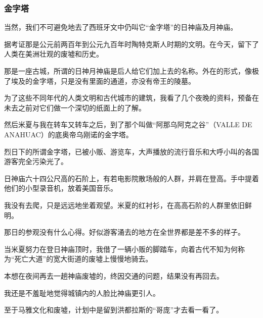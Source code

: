 \subsubsection*{金字塔}
\par 当然，我们不可避免地去了西班牙文中仍叫它“金字塔”的日神庙及月神庙。
\par 据考证那是公元前两百年到公元九百年时陶特克斯人时期的文明。在今天，留下了人类在美洲壮观的废墟和历史。
\par 那是一座古城，所谓的日神月神庙是后人给它们加上去的名称。外在的形式，像极了埃及的金字塔，只是没有里面的通道，亦没有帝王的陵墓。
\par 为了这些不同年代的人类文明和古代城市的建筑，我看了几个夜晚的资料，预备在未去之前对它们做一个深切的纸面上的了解。
\par 然后米夏与我在转车又转车之后，到了那个叫做“阿那乌阿克之谷”（VALLE DE ANAHUAC）的底奥帝乌刚诺的金字塔。
\par 烈日下的所谓金字塔，已被小贩、游览车，大声播放的流行音乐和大呼小叫的各国游客完全污染光了。
\par 日神庙六十四公尺高的石阶上，有若电影院散场般的人群，并肩在登高。手中提着他们的小型录音机，放着美国音乐。
\par 我没有去爬，只是远远地坐着观望。米夏的红衬衫，在高高石阶的人群里依旧鲜明。
\par 那日的参观没有什么心得。好似游客涌去的地方在全世界都是差不多的样子。
\par 当米夏努力在登日神庙顶时，我借了一辆小贩的脚踏车，向着古代不知为何称为“死亡大道”的宽大街道的废墟上慢慢地骑去。
\par 本想在夜间再去一趟神庙废墟的，终因交通的问题，结果没有再回去。
\par 我还是不羞耻地觉得城镇内的人脸比神庙更引人。
\par 至于马雅文化和废墟，计划中是留到洪都拉斯的“哥庞”才去看一看了。


